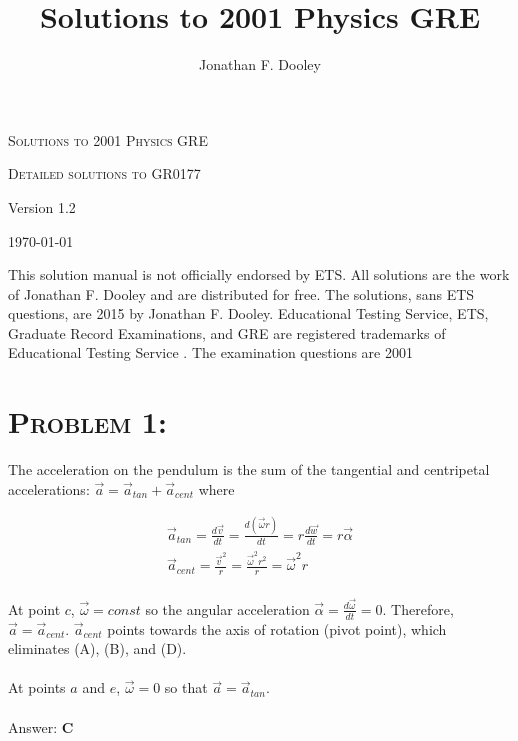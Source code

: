 \documentclass{article}
\title{Solutions to 2001 Physics GRE}
\author{Jonathan F. Dooley}
\begin{document}
\begin{titlepage}
\centering
{\scshape\LARGE Solutions to 2001 Physics GRE \par}
\vspace{.5cm}

{\scshape\Large Detailed solutions to GR0177\par}
\vspace{6cm}

{\huge Version 1.2 \par}
\vspace{1cm}
{\large \today\par}
\vspace{6cm}

This solution manual is not officially endorsed by ETS. All solutions are the work of Jonathan F. Dooley and are distributed for free. The solutions, sans ETS questions, are \textcopyright  \hspace{.001in} 2015 by Jonathan F. Dooley.
Educational Testing Service, ETS, Graduate Record Examinations, and GRE are registered trademarks of Educational Testing Service \hspace{.001in} \textregistered. The examination questions are \textcopyright  \hspace{.001in} 2001
\end{titlepage}


\section{\textsc{Problem 1:}} The acceleration on the pendulum is the sum of the tangential and centripetal accelerations: $\vec{a} = \vec{a}_{tan} + \vec{a}_{cent}$ where

\begin{gather}
\vec{a}_{tan} = \frac{d\vec{v}}{dt} = \frac{d (\vec{\omega} r)}{d t} = r \frac{d\vec{w}}{dt} = r \vec{\alpha}\\
\vec{a}_{cent} = \frac{\vec{v}^{2}}{r} = \frac{\vec{\omega}^{2} r^{2}}{r} = \vec{\omega}^{2} r
\end{gather}
\\
At point $c$, $\vec{\omega} = const$ so the angular acceleration $\vec{\alpha} = \frac{d \vec{\omega}}{dt} = 0$. Therefore, $\vec{a} = \vec{a}_{cent}$. $\vec{a}_{cent}$ points towards the axis of rotation (pivot point), which eliminates (A), (B), and (D).\\
\\
At points $a$ and $e$, $\vec{\omega} = 0$ so that $\vec{a} = \vec{a}_{tan}$.
\\\\
Answer: \textbf{\textcolor{ProcessBlue}C}\\
\end{document}
